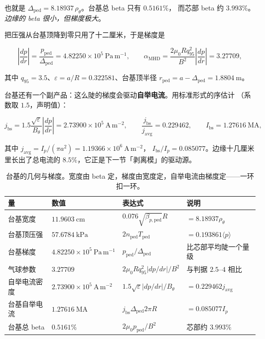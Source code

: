 也就是 $\Delta_{\mathrm{ped}}=8.18937\,\rho_\theta$。台基总 beta 只有 $0.5161\%$，
而芯部 beta 约 $3.993\%$。\emph{边缘的 beta 很小，但梯度极大}。

把压强从台基顶降到零只用了十二厘米，于是梯度是

\begin{equation}
\left|\frac{dp}{dr}\right|=\frac{p_{\mathrm{ped}}}{\Delta_{\mathrm{ped}}}
=4.82250\times10^{5}\ \mathrm{Pa\,m^{-1}},
\qquad
\alpha_{\mathrm{MHD}}=\frac{2\mu_0Rq_{95}^2}{B^2}\left|\frac{dp}{dr}\right|=3.27709,
\label{eq:app-ad-grad}
\end{equation}

其中 $q_{95}=3.5$、$\varepsilon=a/R=0.322581$、台基顶半径 $r_{\mathrm{ped}}=a-\Delta_{\mathrm{ped}}=1.8804\ \mathrm{m}$。

台基还有一个副产品：这么陡的梯度会驱动\textbf{自举电流}。用标准形式的序估计
（系数取 $1.5$，声明值）：

\begin{equation}
j_{\mathrm{bs}}=1.5\frac{\sqrt{\varepsilon}}{B_\theta}\left|\frac{dp}{dr}\right|
=2.73900\times10^{5}\ \mathrm{A\,m^{-2}},
\qquad
\frac{j_{\mathrm{bs}}}{j_{\mathrm{avg}}}=0.229462,
\qquad
I_{\mathrm{bs}}=1.27616\ \mathrm{MA},
\label{eq:app-ad-jbs}
\end{equation}

其中 $j_{\mathrm{avg}}=I_p/(\pi a^2)=1.19366\times10^{6}\ \mathrm{A\,m^{-2}}$，
$I_{\mathrm{bs}}/I_p=0.085077$。边缘十几厘米里长出了总电流的 $8.5\%$，它正是下一节「剥离模」的驱动源。

\begin{table}[htbp]
\centering
\small
\caption{台基的几何与梯度。宽度由 beta 定，梯度由宽度定，自举电流由梯度定——一环扣一环。}
\label{tab:app-ad-pedestal}
\begin{tabular}{p{3.5cm}p{3.2cm}p{4.1cm}p{4.1cm}}
\toprule
量 & 数值 & 表达式 & 说明 \\
\midrule
台基宽度 & $11.9603\ \mathrm{cm}$ & $0.076\sqrt{\beta_{p,\mathrm{ped}}}R$ & $=8.18937\rho_\theta$ \\
台基顶压强 & $57.6784\ \mathrm{kPa}$ & $2n_{\mathrm{ped}}T_{\mathrm{ped}}$ & $=0.193861\langle p\rangle$ \\
台基梯度 & $4.82250\times10^{5}\ \mathrm{Pa\,m^{-1}}$ & $p_{\mathrm{ped}}/\Delta_{\mathrm{ped}}$ & 比芯部平均陡一个量级 \\
气球参数 & $3.27709$ & $2\mu_0Rq_{95}^2|dp/dr|/B^2$ & 与判据 $2.5$--$4$ 相比 \\
自举电流密度 & $2.73900\times10^{5}\ \mathrm{A\,m^{-2}}$ & $1.5\sqrt{\varepsilon}|dp/dr|/B_\theta$ & $=0.229462j_{\mathrm{avg}}$ \\
台基自举电流 & $1.27616\ \mathrm{MA}$ & $j_{\mathrm{bs}}\Delta_{\mathrm{ped}}2\pi R$ & $=0.085077I_p$ \\
台基总 beta & $0.5161\%$ & $2\mu_0p_{\mathrm{ped}}/B^2$ & 芯部约 $3.993\%$ \\
\bottomrule
\end{tabular}

\end{table}

